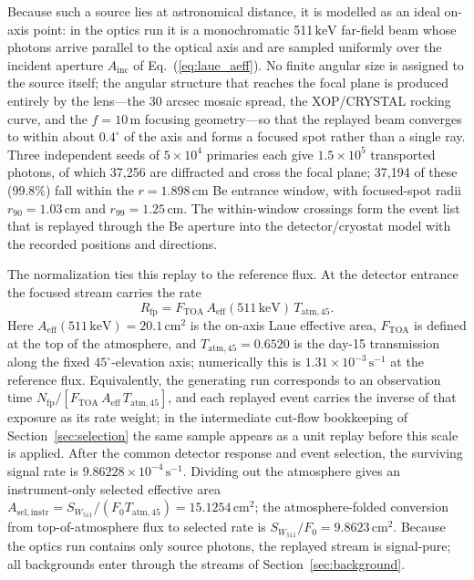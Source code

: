 \documentclass[11pt]{article}
\newcommand{\keV}{\ensuremath{\,\mathrm{keV}}}
\newcommand{\cps}{\ensuremath{\,\mathrm{s^{-1}}}}
\newcommand{\wii}{W_{511}}
\newcommand{\aeff}{A_{\mathrm{eff}}}
\newcommand{\fzero}{F_{0}}
\begin{document}
Because such a source lies at astronomical distance, it is modelled as an ideal
on-axis point: in the optics run it is a monochromatic 511\keV{} far-field beam
whose photons arrive parallel to the optical axis and are sampled uniformly over
the incident aperture $A_{\mathrm{inc}}$ of Eq.~(\ref{eq:laue_aeff}). No finite
angular size is assigned to the source itself; the angular structure that reaches
the focal plane is produced entirely by the lens---the 30 arcsec mosaic spread,
the XOP/CRYSTAL rocking curve, and the $f=10\,\mathrm{m}$ focusing geometry---so
that the replayed beam converges to within about $0.4^\circ$ of the axis and
forms a focused spot rather than a single ray. Three independent seeds of
$5\times10^{4}$ primaries each give $1.5\times10^{5}$ transported photons, of
which 37,256 are diffracted and cross the focal plane; 37,194 of these (99.8\%)
fall within the $r=1.898\,\mathrm{cm}$ Be entrance window, with focused-spot
radii $r_{90}=1.03\,\mathrm{cm}$ and $r_{99}=1.25\,\mathrm{cm}$. The
within-window crossings form the event list that is replayed through the Be
aperture into the detector/cryostat model with the recorded positions and
directions.

The normalization ties this replay to the reference flux. At the detector
entrance the focused stream carries the rate
\begin{equation}
  R_{\mathrm{fp}}=F_{\mathrm{TOA}}\,\aeff(511\keV)\,T_{\mathrm{atm},45} .
\end{equation}
Here
$\aeff(511\keV)=20.1\,\mathrm{cm^2}$ is the on-axis Laue effective area,
$F_{\mathrm{TOA}}$ is defined at the top of the atmosphere, and
$T_{\mathrm{atm},45}=0.6520$ is the day-15 transmission along the fixed
$45^\circ$-elevation axis; numerically this is $1.31\times10^{-3}\cps$ at the
reference flux.
Equivalently, the generating run corresponds to an observation time
$N_{\mathrm{fp}}/[F_{\mathrm{TOA}}\,\aeff\,T_{\mathrm{atm},45}]$, and each replayed event carries the inverse
of that exposure as its rate weight; in the intermediate cut-flow bookkeeping of
Section~\ref{sec:selection} the same sample appears as a unit replay before this
scale is applied. After the common detector response and event selection, the
surviving signal rate is $9.86228\times10^{-4}\cps$. Dividing out the atmosphere
gives an instrument-only selected effective area
$A_{\mathrm{sel,instr}}=S_{\wii}/(\fzero T_{\mathrm{atm},45})=15.1254\,\mathrm{cm^2}$;
the atmosphere-folded conversion from top-of-atmosphere flux to selected rate is
$S_{\wii}/\fzero=9.8623\,\mathrm{cm^2}$. Because the optics run
contains only source photons, the replayed stream is signal-pure; all
backgrounds enter through the streams of Section~\ref{sec:background}.
\end{document}
